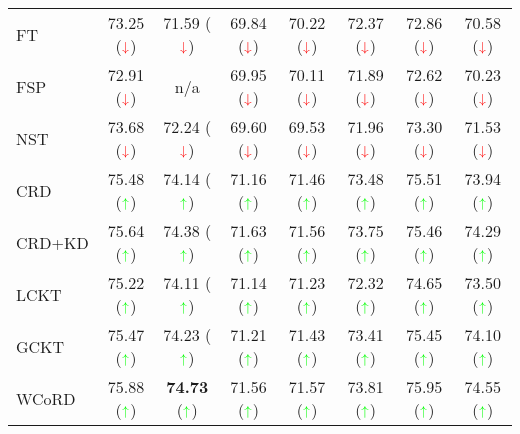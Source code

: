 \documentclass[final]{cvpr}
\theoremstyle{definition}
\newcommand*{\mathcolor}{}
\def\mathcolor#1#{\mathcoloraux{#1}}
\newcommand*{\mathcoloraux}[3]{\protect\leavevmode
  \begingroup
    \color#1{#2}#3\endgroup
}
\begin{document}
\begin{table*}[t!]
\begin{center}
\begin{tabular}{lccccccc}
FT  & 73.25 ($\mathcolor{red}{\downarrow}$)& 71.59 ($\mathcolor{red}{\downarrow}$)& 69.84 ($\mathcolor{red}{\downarrow}$)& 70.22 ($\mathcolor{red}{\downarrow}$)& 72.37 ($\mathcolor{red}{\downarrow}$)& 72.86 ($\mathcolor{red}{\downarrow}$)& 70.58 ($\mathcolor{red}{\downarrow}$)\\
FSP & 72.91 ($\mathcolor{red}{\downarrow}$)& 
 n/a & 69.95 ($\mathcolor{red}{\downarrow}$)& 70.11 ($\mathcolor{red}{\downarrow}$)& 71.89 ($\mathcolor{red}{\downarrow}$)& 72.62 ($\mathcolor{red}{\downarrow}$)& 70.23 ($\mathcolor{red}{\downarrow}$)\\
NST  & 73.68 ($\mathcolor{red}{\downarrow}$)& 72.24 ($\mathcolor{red}{\downarrow}$)& 69.60 ($\mathcolor{red}{\downarrow}$)& 69.53 ($\mathcolor{red}{\downarrow}$)& 71.96 ($\mathcolor{red}{\downarrow}$)& 73.30 ($\mathcolor{red}{\downarrow}$)& 71.53 ($\mathcolor{red}{\downarrow}$)\\
CRD & {75.48} ($\mathcolor{green}{\uparrow}$)& {74.14} ($\mathcolor{green}{\uparrow}$)& {71.16} ($\mathcolor{green}{\uparrow}$)& {71.46} ($\mathcolor{green}{\uparrow}$)& {73.48} ($\mathcolor{green}{\uparrow}$)& {75.51} ($\mathcolor{green}{\uparrow}$)& {73.94} ($\mathcolor{green}{\uparrow}$)\\
CRD+KD & 75.64 ($\mathcolor{green}{\uparrow}$)& 74.38 ($\mathcolor{green}{\uparrow}$)& 71.63 ($\mathcolor{green}{\uparrow}$)& 71.56 ($\mathcolor{green}{\uparrow}$)& 73.75 ($\mathcolor{green}{\uparrow}$)& 75.46 ($\mathcolor{green}{\uparrow}$)& 74.29 ($\mathcolor{green}{\uparrow}$)\\
\midrule
LCKT & 75.22 ($\mathcolor{green}{\uparrow}$)& 74.11 ($\mathcolor{green}{\uparrow}$)& 71.14 ($\mathcolor{green}{\uparrow}$)& 71.23 ($\mathcolor{green}{\uparrow}$)& 72.32 ($\mathcolor{green}{\uparrow}$)& 74.65 ($\mathcolor{green}{\uparrow}$)& 73.50 ($\mathcolor{green}{\uparrow}$)\\

GCKT & 75.47 ($\mathcolor{green}{\uparrow}$)& 74.23 ($\mathcolor{green}{\uparrow}$)& 71.21 ($\mathcolor{green}{\uparrow}$)& 71.43 ($\mathcolor{green}{\uparrow}$)& 73.41 ($\mathcolor{green}{\uparrow}$)& 75.45 ($\mathcolor{green}{\uparrow}$)& 74.10 ($\mathcolor{green}{\uparrow}$)\\

WCoRD & 75.88 ($\mathcolor{green}{\uparrow}$)& \textbf{74.73} ($\mathcolor{green}{\uparrow}$)& 71.56 ($\mathcolor{green}{\uparrow}$)& 71.57 ($\mathcolor{green}{\uparrow}$)& 73.81 ($\mathcolor{green}{\uparrow}$)& 75.95 ($\mathcolor{green}{\uparrow}$)& 74.55 ($\mathcolor{green}{\uparrow}$)\\
                                                      

\end{tabular}
\end{center}
\end{table*}
\end{document}
